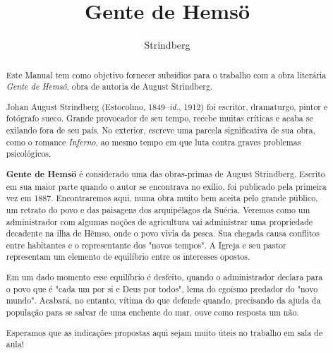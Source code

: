 \documentclass[12pt]{extarticle}
\begin{document}
\newcommand{\AutorLivro}{Strindberg}
\newcommand{\TituloLivro}{Gente de Hemsö}
\newcommand{\Tema}{Ficção, mistério e fantasia}
\newcommand{\Genero}{Romance}
\newcommand{\imagemCapa}{./images/PNLD0039-01.png}
\newcommand{\issnppub}{---}
\newcommand{\issnepub}{---}
\newcommand{\colaborador}{\textbf{Bruno Gradella e Vicente Castro} é uma pessoa incrível e vai fazer um bom serviço.}


\title{\TituloLivro}
\author{\AutorLivro}
\def\authornotes{\colaborador}

\date{}
\maketitle

\baselineskip\par

\begin{abstract}
Este Manual tem como objetivo fornecer subsídios para o trabalho com a
obra literária \emph{Gente de Hemsö}, obra de autoria de August
Strindberg.

Johan August Strindberg (Estocolmo, 1849--\textit{id.}, 1912) 
foi escritor, dramaturgo, pintor e fotógrafo sueco. Grande provocador
de seu tempo, recebe muitas críticas e acaba se exilando fora de 
seu país. No exterior, escreve uma parcela significativa de sua obra,
como o romance \textit{Inferno}, ao mesmo tempo em que luta contra graves 
problemas psicológicos.

\textbf{Gente de Hemsö} é considerado uma das obras-primas de August Strindberg. 
Escrito em sua maior parte quando o autor se encontrava no exílio, foi publicado 
pela primeira vez em 1887. Encontraremos aqui, numa obra muito bem aceita pelo grande 
público, um retrato do povo e das paisagens dos arquipélagos da Suécia.
Veremos como um administrador com algumas noções de agricultura vai administrar uma 
propriedade decadente na ilha de Hëmso, onde o povo vivia da pesca. Sua chegada causa 
conflitos entre habitantes e o representante dos "novos tempos". A Igreja e seu 
pastor representam um elemento de equilíbrio entre os interesses opostos.

Em um dado momento esse equilíbrio é desfeito, quando o administrador declara
para o povo que é "cada um por si e Deus por todos", lema do egoísmo predador
do "novo mundo". Acabará, no entanto, vítima do que defende quando, precisando
da ajuda da população para se salvar de uma enchente do mar, ouve como resposta
um não.

Esperamos que as indicações propostas aqui sejam muito úteis no trabalho em
sala de aula! 
\end{abstract}
\end{document}
